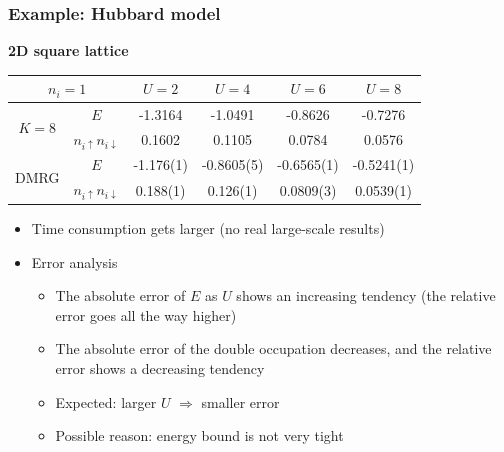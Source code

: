 \documentclass{beamer}
\begin{document}
\begin{frame}
\frametitle{Example: Hubbard model}

\textbf{2D square lattice}    

\begin{center}
    \begin{tabular}{cccccc}
        \toprule
        \multicolumn{2}{c}{$n_i=1$}                                 & $U=2$   & $U=4$   & $U=6$   & $U=8$  \\
        \midrule
        \multirow{2}{*}{$K=8$}     & $E$                               & -1.3164 & -1.0491 & -0.8626 & -0.7276  \\
                                    & $n_{i \uparrow} n_{i \downarrow}$ &  0.1602 &  0.1105 &  0.0784 &  0.0576  \\
        \midrule
        \multirow{2}{*}{DMRG}  & $E$                               & -1.176(1) & -0.8605(5) & -0.6565(1) & -0.5241(1)  \\
                                    & $n_{i \uparrow} n_{i \downarrow}$ &  0.188(1) &  0.126(1) &  0.0809(3) &  0.0539(1)  \\
        \bottomrule
    \end{tabular}
\end{center}

\begin{itemize}
    \item Time consumption gets larger (no real large-scale results)
    \item Error analysis
    \begin{itemize}
        \item The absolute error of $E$ as $U$ shows an increasing tendency (the relative error goes all the way higher)
        \item The absolute error of the double occupation decreases, and the relative error shows a decreasing tendency
        \item Expected: larger $U$ $\Rightarrow$ smaller error 
        \item Possible reason: energy bound is not very tight 
    \end{itemize}
    
\end{itemize}

\end{frame}
\end{document}
